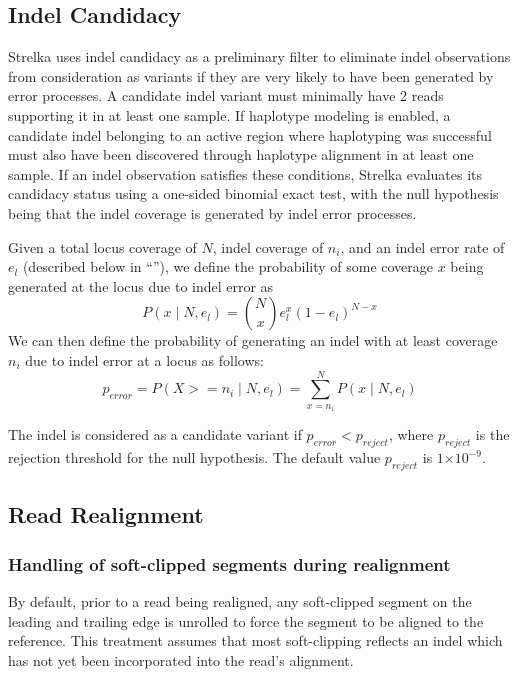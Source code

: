 \documentclass{article}
\newcommand{\e}[1]{\ensuremath{\times 10^{#1}}}
\begin{document}
\subsection{Indel Candidacy}
\label{sec:IndelCandidacy}

Strelka uses indel candidacy as a preliminary filter to eliminate indel observations from consideration as variants if they are very likely to have been generated by error processes.  A candidate indel variant must minimally have 2 reads supporting it in at least one sample. If haplotype modeling is enabled, a candidate indel belonging to an active region where haplotyping was successful must also have been discovered through haplotype alignment in at least one sample. If an indel observation satisfies these conditions, Strelka evaluates its candidacy status using a one-sided binomial exact test, with the null hypothesis being that the indel coverage is generated by indel error processes.

Given a total locus coverage of $N$, indel coverage of $n_i$, and an indel error rate of $e_l$ (described below in ``''), we define the probability of some coverage $x$ being generated at the locus due to indel error as
\begin{equation*}
P(x \mid N, e_l) = \binom {N} {x} e^{x}_l (1 - e_l)^{N - x}
\end{equation*}
We can then define the probability of generating an indel with at least coverage $n_i$ due to indel error at a locus as follows:
\begin{equation*}
p_{error} = P(X >= n_i \mid N, e_l) = \sum_{x = n_i}^{N} P(x \mid N, e_l)
\end{equation*}

\noindent The indel is considered as a candidate variant if $p_{error} < p_{reject}$, where $p_{reject}$ is the rejection threshold for the null hypothesis. The default value $p_{reject}$ is $1\e{-9}$.


\subsection{Read Realignment}

\subsubsection{Handling of soft-clipped segments during realignment}

By default, prior to a read being realigned, any soft-clipped segment on the leading and trailing edge is unrolled to force the segment to be aligned to the reference. This treatment assumes that most soft-clipping reflects an indel which has not yet been incorporated into the read's alignment.
\end{document}
